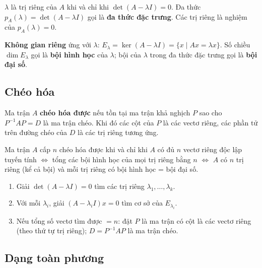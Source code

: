 \documentclass[12pt,a4paper]{article}
\begin{document}
\begin{congthuc}[title={Phương trình đặc trưng}]
  $\lambda$ là trị riêng của $A$ khi và chỉ khi $\det(A - \lambda I) = 0$. Đa thức $p_A(\lambda) = \det(A - \lambda I)$ gọi là \textbf{đa thức đặc trưng}. Các trị riêng là nghiệm của $p_A(\lambda) = 0$.
\end{congthuc}

\begin{dinhnghia}
  \textbf{Không gian riêng} ứng với $\lambda$: $E_\lambda = \ker(A - \lambda I) = \{x \mid Ax = \lambda x\}$. Số chiều $\dim E_\lambda$ gọi là \textbf{bội hình học} của $\lambda$; bội của $\lambda$ trong đa thức đặc trưng gọi là \textbf{bội đại số}.
\end{dinhnghia}

\subsection{Chéo hóa}

\begin{dinhnghia}
  Ma trận $A$ \textbf{chéo hóa được} nếu tồn tại ma trận khả nghịch $P$ sao cho $P^{-1}AP = D$ là ma trận chéo. Khi đó các cột của $P$ là các vectơ riêng, các phần tử trên đường chéo của $D$ là các trị riêng tương ứng.
\end{dinhnghia}

\begin{dinhly}[title={Điều kiện chéo hóa được}]
  Ma trận $A$ cấp $n$ chéo hóa được khi và chỉ khi $A$ có đủ $n$ vectơ riêng độc lập tuyến tính $\Leftrightarrow$ tổng các bội hình học của mọi trị riêng bằng $n$ $\Leftrightarrow$ $A$ có $n$ trị riêng (kể cả bội) và mỗi trị riêng có bội hình học = bội đại số.
\end{dinhly}

\begin{phuongphap}[title={Cách chéo hóa}]
  \begin{enumerate}
    \item Giải $\det(A - \lambda I) = 0$ tìm các trị riêng $\lambda_1, \ldots, \lambda_k$.
    \item Với mỗi $\lambda_i$, giải $(A - \lambda_i I)x = 0$ tìm cơ sở của $E_{\lambda_i}$.
    \item Nếu tổng số vectơ tìm được $= n$: đặt $P$ là ma trận có cột là các vectơ riêng (theo thứ tự trị riêng); $D = P^{-1}AP$ là ma trận chéo.
  \end{enumerate}
\end{phuongphap}

\subsection{Dạng toàn phương}
\end{document}
